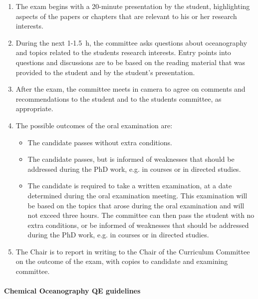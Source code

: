 \documentclass[12pt]{article}
\newcounter{parcount}
\newcommand\cp{\setcounter{parcount}{0}}
\begin{document}
\begin{enumerate}
\item The exam begins with a 20-minute presentation by the student,
highlighting aspects of the papers or chapters that are relevant to his or her
research interests.

\item During the next 1-1.5~h, the committee asks questions about oceanography
and topics related to the students research interests. Entry points into
questions and discussions are to be based on the reading material that was
provided to the student and by the student's presentation.

\item After the exam, the committee meets in camera to agree on comments and
recommendations to the student and to the students committee, as appropriate.

\item The possible outcomes of the oral examination are:
\begin{itemize}
\item The candidate passes without extra conditions.

\item The candidate passes, but is informed of weaknesses that should be
addressed during the PhD work, e.g. in courses or in directed studies.

\item The candidate is required to take a written examination, at a date
determined during the oral examination meeting. This examination will be based
on the topics that arose during the oral examination and will not exceed three
hours. The committee can then pass the student with no extra conditions, or be
informed of weaknesses that should be addressed during the PhD work, e.g. in
courses or in directed studies.

\end{itemize}

\item The Chair is to report in writing to the Chair of the Curriculum
Committee on the outcome of the exam, with copies to candidate and examining
committee.

\end{enumerate}


\paragraph{Chemical Oceanography QE guidelines}\hfill

\cp
\end{document}

